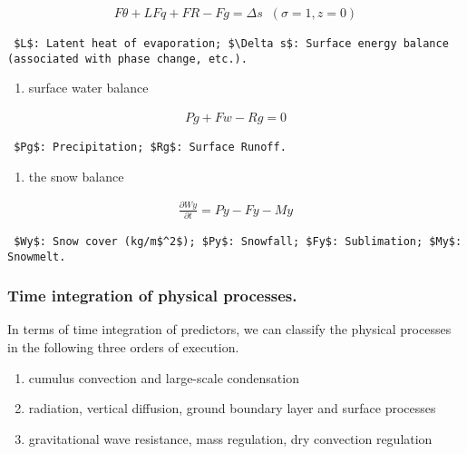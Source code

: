 \begin{eqnarray}
    F{\theta} + L F{q} + F{R} - F{g} = \Delta s \; \; (\sigma=1, z=0)
\end{eqnarray}

\begin{verbatim}
 $L$: Latent heat of evaporation; $\Delta s$: Surface energy balance (associated with phase change, etc.).
\end{verbatim}

\begin{enumerate}
\def\labelenumi{\arabic{enumi}.}
\setcounter{enumi}{6}
\tightlist
\item
  surface water balance
\end{enumerate}

\begin{eqnarray}
  Pg + Fw - Rg = 0
\end{eqnarray}

\begin{verbatim}
 $Pg$: Precipitation; $Rg$: Surface Runoff.
\end{verbatim}

\begin{enumerate}
\def\labelenumi{\arabic{enumi}.}
\setcounter{enumi}{7}
\tightlist
\item
  the snow balance
\end{enumerate}

\begin{eqnarray}
  \frac{\partial{Wy}}{\partial {t}} = Py - Fy - My
\end{eqnarray}

\begin{verbatim}
 $Wy$: Snow cover (kg/m$^2$); $Py$: Snowfall; $Fy$: Sublimation; $My$: Snowmelt.
\end{verbatim}

\hypertarget{time-integration-of-physical-processes.}{%
\subsubsection{Time integration of physical
processes.}\label{time-integration-of-physical-processes.}}

In terms of time integration of predictors, we can classify the physical
processes in the following three orders of execution.

\begin{enumerate}
\def\labelenumi{\arabic{enumi}.}
\item
  cumulus convection and large-scale condensation
\item
  radiation, vertical diffusion, ground boundary layer and surface
  processes
\item
  gravitational wave resistance, mass regulation, dry convection
  regulation
\end{enumerate}

